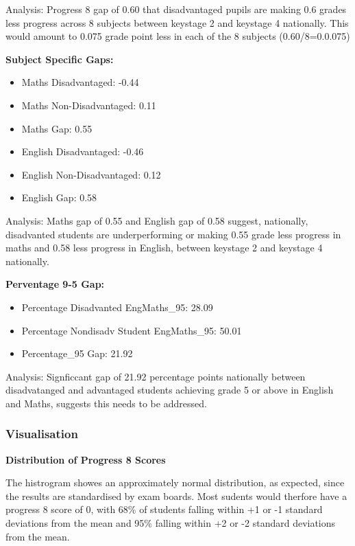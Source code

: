 \documentclass[
  letterpaper,
  DIV=11,
  numbers=noendperiod]{scrartcl}
\begin{document}
Analysis: Progress 8 gap of 0.60 that disadvantaged pupils are making
0.6 grades less progress across 8 subjects between keystage 2 and
keystage 4 nationally. This would amount to 0.075 grade point less in
each of the 8 subjects (0.60/8=0.0.075)

\textbf{Subject Specific Gaps:}

\begin{itemize}
\item
  Maths Disadvantaged: -0.44
\item
  Maths Non-Disadvantaged: 0.11
\item
  Maths Gap: 0.55
\item
  English Disadvantaged: -0.46
\item
  English Non-Disadvantaged: 0.12
\item
  English Gap: 0.58
\end{itemize}

Analysis: Maths gap of 0.55 and English gap of 0.58 suggest, nationally,
disadvanted students are underperforming or making 0.55 grade less
progress in maths and 0.58 less progress in English, between keystage 2
and keystage 4 nationally.

\textbf{Perventage 9-5 Gap:}

\begin{itemize}
\item
  Percentage Disadvanted EngMaths\_95: 28.09
\item
  Percentage Nondisadv Student EngMaths\_95: 50.01
\item
  Percentage\_95 Gap: 21.92
\end{itemize}

Analysis: Signficcant gap of 21.92 percentage points nationally between
disadvatanged and advantaged students achieving grade 5 or above in
English and Maths, suggests this needs to be addressed.

\subsubsection{Visualisation}\label{visualisation}

\textbf{Distribution of Progress 8 Scores}

The histrogram showes an approximately normal distribution, as expected,
since the results are standardised by exam boards. Most sudents would
therfore have a progress 8 score of 0, with 68\% of students falling
within +1 or -1 standard deviations from the mean and 95\% falling
within +2 or -2 standard deviations from the mean.
\end{document}
